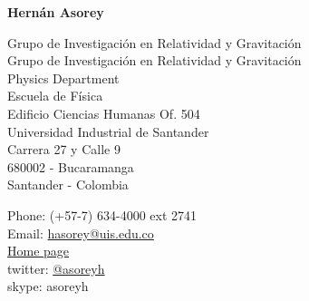 \begin{center}{\huge \bf Hernán Asorey}\\[1cm]\end{center}

\begin{minipage}[t]{0.595\textwidth}
\ifeng
  Grupo de Investigación en Relatividad y Gravitación \\
\else
  Grupo de Investigación en Relatividad y Gravitación \\
\fi
\ifeng 
  Physics Department\\
\else
  Escuela de Física\\
\fi
  Edificio Ciencias Humanas Of. 504\\
  Universidad Industrial de Santander\\
  Carrera 27 y Calle 9\\
  680002 - Bucaramanga\\
  Santander - Colombia\\[.2cm]
\end{minipage}
\begin{minipage}[t]{0.395\textwidth}
  Phone: (+57-7) 634-4000 ext 2741\\
  Email: \href{mailto:hasorey@uis.edu.co}{hasorey@uis.edu.co}\\
  \href{http://fisica.cab.cnea.gov.ar/particulas/wiki/User:Asoreyh}{Home page}\\
  twitter: \href{https://twitter.com/#!/asoreyh}{@asoreyh}\\
  skype: asoreyh\\
\end{minipage}



